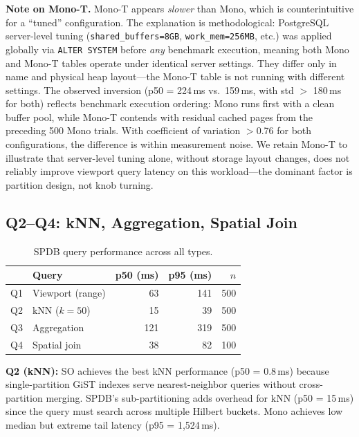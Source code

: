 \documentclass[10pt,twocolumn]{article}
\begin{document}
\textbf{Note on Mono-T.}
Mono-T appears \emph{slower} than Mono, which is counterintuitive for a ``tuned'' configuration.
The explanation is methodological: PostgreSQL server-level tuning (\texttt{shared\_buffers=8GB}, \texttt{work\_mem=256MB}, etc.) was applied globally via \texttt{ALTER SYSTEM} before \emph{any} benchmark execution, meaning both Mono and Mono-T tables operate under identical server settings.
They differ only in name and physical heap layout---the Mono-T table is not running with different settings.
The observed inversion (p50 = 224\,ms vs.\ 159\,ms, with std $>$ 180\,ms for both) reflects benchmark execution ordering: Mono runs first with a clean buffer pool, while Mono-T contends with residual cached pages from the preceding 500 Mono trials.
With coefficient of variation $>$0.76 for both configurations, the difference is within measurement noise.
We retain Mono-T to illustrate that server-level tuning alone, without storage layout changes, does not reliably improve viewport query latency on this workload---the dominant factor is partition design, not knob turning.

\subsection{Q2--Q4: kNN, Aggregation, Spatial Join}

\begin{table}[t]
\centering
\caption{SPDB query performance across all types.}
\label{tab:allqueries}
\begin{tabular}{@{}llrrr@{}}
\toprule
& \textbf{Query} & \textbf{p50 (ms)} & \textbf{p95 (ms)} & \textbf{$n$} \\
\midrule
Q1 & Viewport (range) & 63 & 141 & 500 \\
Q2 & kNN ($k{=}50$) & 15 & 39 & 500 \\
Q3 & Aggregation & 121 & 319 & 500 \\
Q4 & Spatial join & 38 & 82 & 100 \\
\bottomrule
\end{tabular}
\end{table}

\textbf{Q2 (kNN):} SO achieves the best kNN performance (p50 = 0.8\,ms) because single-partition GiST indexes serve nearest-neighbor queries without cross-partition merging.
SPDB's sub-partitioning adds overhead for kNN (p50 = 15\,ms) since the query must search across multiple Hilbert buckets.
Mono achieves low median but extreme tail latency (p95 = 1{,}524\,ms).
\end{document}
